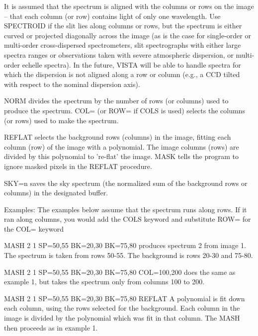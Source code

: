 It is assumed that the spectrum is aligned with the columns or rows on the
image -- that each column (or row) contains light of only one wavelength.
Use SPECTROID if the slit lies along columns or rows, but the spectrum is
either curved or projected diagonally across the image (as is the case for
single-order or multi-order cross-dispersed spectrometers, slit
spectrographs with either large spectra ranges or observations taken with
severe atmospheric dispersion, or multi-order echelle spectra).  In the
future, VISTA will be able to handle spectra for which the dispersion is
not aligned along a row or column (e.g., a CCD tilted with respect to the
nominal dispersion axis).

NORM divides the spectrum by the number of rows (or columns) used to
produce the spectrum.  COL= (or ROW= if COLS is used) selects the columns
(or rows) used to make the spectrum.

REFLAT selects the background rows (columns) in the image, fitting each
column (row) of the image with a polynomial.  The image columns (rows) are
divided by this polynomial to 're-flat' the image.  MASK tells the program
to ignore masked pixels in the REFLAT procedure.

SKY=n saves the sky spectrum (the normalized sum of the background rows or
columns) in the designated buffer.

Examples: The examples below assume that the spectrum runs along rows.  If
it ran along columns, you would add the COLS keyword and substitute ROW=
for the COL= keyword
\begin{example}
  \item[MASH 2 1 SP=50,55 BK=20,30 BK=75,80\hfill]{ produces spectrum 2
       from image 1.  The spectrum is taken from rows 50-55.  The
       background is rows 20-30 and 75-80.}

  \item[MASH 2 1 SP=50,55 BK=20,30 BK=75,80 COL=100,200\hfill]{ does the
       same as example 1, but takes the spectrum only from columns 100 to
       200.}

  \item[MASH 2 1 SP=50,55 BK=20,30 BK=75,80 REFLAT\hfill]{ A polynomial is
       fit down each column, using the rows selected for the background.
       Each column in the image is divided by the polynomial which was fit
       in that column.  The MASH then proceeds as in example 1.}
\end{example}

